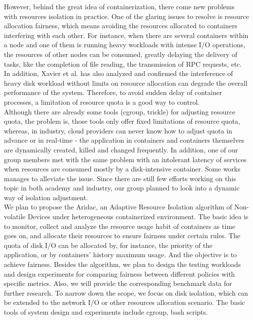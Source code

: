 \documentclass[10pt, conference,compsoc]{IEEEtran}
\begin{document}
However, behind the great idea of containerization, there come new problems with resources isolation in practice. One of the glaring issues to resolve is resource allocation fairness, which means avoiding the resources allocated to containers interfering with each other. For instance, when there are several containers within a node and one of them is running heavy workloads with intense I/O operations, the resources of other nodes can be consumed, greatly delaying the delivery of tasks, like the completion of file reading, the transmission of RPC requests, etc. In addition, Xavier et al. \cite{Xavier2015API} has also analyzed and confirmed the interference of heavy disk workload without limits on resource allocation can degrade the overall performance of the system. Therefore, to avoid sudden delay of container processes, a limitation of resource quota is a good way to control.\\

Although there are already some tools (cgroup, trickle) for adjusting resource quota, the problem is, those tools only offer fixed limitations of resource quota, whereas, in industry, cloud providers can never know how to adjust quota in advance or in real-time - the application in containers and containers themselves are dynamically created, killed and changed frequently. In addition, one of our group members met with the same problem with an intolerant latency of services when resources are consumed mostly by a disk-intensive container. Some works \cite{Sungyong16} manages to alleviate the issue. Since there are still few efforts working on this topic in both academy and industry, our group planned to look into a dynamic way of isolation adjustment.\\

We plan to propose the Aridac, an Adaptive Resource Isolation algorithm of Non-volatile Devices under heterogeneous containerized environment. The basic idea is to monitor, collect and analyze the resource usage habit of containers as time goes on, and allocate their resources to ensure fairness under certain rules. The quota of disk I/O can be allocated by, for instance, the priority of the application, or by containers' history maximum usage. And the objective is to achieve fairness. Besides the algorithm, we plan to design the testing workloads and design experiments for comparing fairness between different policies with specific metrics. Also, we will provide the corresponding benchmark data for further research. To narrow down the scope, we focus on disk isolation, which can be extended to the network I/O or other resources allocation scenario. The basic tools of system design and experiments include cgroup, bash scripts.\\
\end{document}
